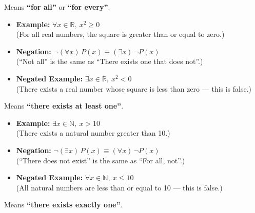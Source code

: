 \begin{description}[leftmargin=1.5cm, labelindent=1cm, style=sameline]

	\item[\textbf{Universal Quantifier:} \quad $\forall$]
		Means \textbf{``for all''} or \textbf{``for every''}.

		\begin{itemize}
			\item \textbf{Example:} \quad $\forall x \in \mathbb{R},\ x^2 \geq 0$ \\
			      (For all real numbers, the square is greater than or equal to zero.)

			\item \textbf{Negation:} \quad $\neg (\forall x)\,P(x) \equiv (\exists x)\, \neg P(x)$ \\
			      (``Not all'' is the same as ``There exists one that does not''.)

			\item \textbf{Negated Example:} \quad $\exists x \in \mathbb{R},\ x^2 < 0$ \\
			      (There exists a real number whose square is less than zero — this is false.)
		\end{itemize}

	\item[\textbf{Existential Quantifier:} \quad $\exists$]
		Means \textbf{``there exists at least one''}.

		\begin{itemize}
			\item \textbf{Example:} \quad $\exists x \in \mathbb{N},\ x > 10$ \\
			      (There exists a natural number greater than 10.)

			\item \textbf{Negation:} \quad $\neg (\exists x)\,P(x) \equiv (\forall x)\, \neg P(x)$ \\
			      (``There does not exist'' is the same as ``For all, not''.)

			\item \textbf{Negated Example:} \quad $\forall x \in \mathbb{N},\ x \leq 10$ \\
			      (All natural numbers are less than or equal to 10 — this is false.)
		\end{itemize}

	\item[\textbf{Unique Existential Quantifier:} \quad $\exists!$]
		Means \textbf{``there exists exactly one''}.


\end{description}
